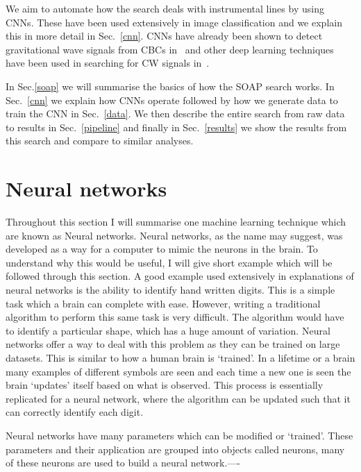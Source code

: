 %

We aim to automate how the search deals with instrumental lines by using \acp{CNN}.
These have been used extensively in image classification and we explain this in
more detail in Sec.~\ref{cnn}. \acp{CNN}
have already been shown to detect gravitational wave signals from \acp{CBC}
in~\cite{gabbard2018MatchingMatched,george2018DeepLearning,gebhard2019ConvolutionalNeural}
and other deep learning techniques have been used in searching for \ac{CW}
signals in~\cite{dreissigacker2019DeeplearningContinuous}. 

%
In Sec.\ref{soap} we will summarise the basics of how the SOAP search works. In
Sec.~\ref{cnn} we explain how \acp{CNN} operate followed by how we generate
data to train the \ac{CNN} in Sec.~\ref{data}. We then describe the entire search from raw data to results in Sec.~\ref{pipeline} and finally in Sec.~\ref{results} we
show the results from this search and compare to similar analyses. 

\section{\label{machine:nn}Neural networks}


Throughout this section I will summarise one machine learning technique which are known as Neural networks. 
Neural networks, as the name may suggest, was developed as a way for a computer to mimic the neurons in the brain.
To understand why this would be useful, I will give short example which will be followed through this section.
A good example used extensively in explanations of neural networks is the ability to identify hand written digits.
This is a simple task which a brain can complete with ease. 
However, writing a traditional algorithm to perform this same task is very difficult. 
The algorithm would have to identify a particular shape, which has a huge amount of variation.
Neural networks offer a way to deal with this problem as they can be trained on large datasets.
This is similar to how a human brain is `trained'. 
In a lifetime or a brain many examples of different symbols are seen and each time a new one is seen the brain `updates' itself based on what is observed. 
This process is essentially replicated for a neural network, where the algorithm can be updated such that it can correctly identify each digit.

Neural networks have many parameters which can be modified or `trained'. 
These parameters and their application are grouped into objects called neurons, many of these neurons are used to build a neural network.----

